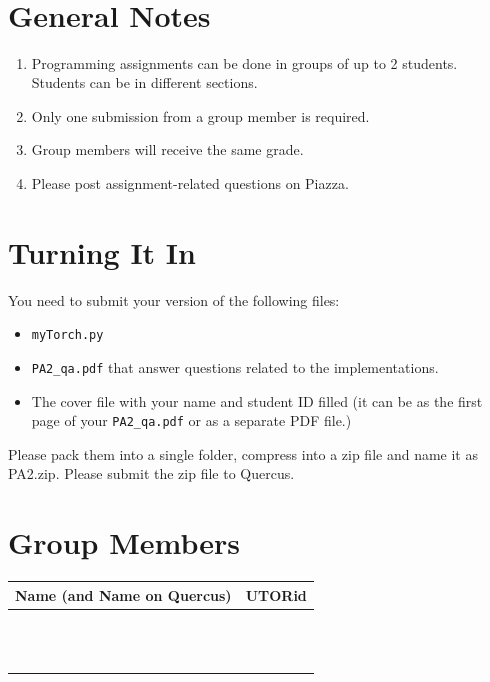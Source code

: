 \documentclass{article}
\title{\vspace{-2.5cm}\textbf{\coursefullname}\\\hatypeandnun\\\haname}
\date{}
\theoremstyle{definition}
\begin{document}
\maketitle
\vspace*{-2cm}
\section*{General Notes}
\begin{enumerate}
	\item Programming assignments can be done in groups of up to 2 students. Students can be in different sections.
	\item Only one submission from a group member is required.
	\item Group members will receive the same grade.
	\item Please post assignment-related questions on Piazza.
\end{enumerate}

\section*{Turning It In}
You need to submit your version of the following files:
\begin{itemize}
	\item \verb|myTorch.py|
	\item \verb|PA2_qa.pdf| that answer questions related to the implementations.
	\item The cover file with your name and student ID filled (it can be as the first page of your \verb|PA2_qa.pdf| or as a separate PDF file.)
\end{itemize}
Please pack them into a single folder, compress into a zip file and name it as PA2.zip. Please submit the zip file to Quercus.

\section*{Group Members}
\begin{center}
	\begin{tabular}{|p{4.5in}|p{2in}|}
		\hline
		Name (and Name on Quercus) & UTORid\\\hline
		& \\
		& \\
		& \\
		& \\
		& \\
		& \\\hline
		& \\
		& \\
		& \\
		& \\
		& \\
		& \\
		\hline
	\end{tabular}
\end{center}
\newpage
\end{document}

